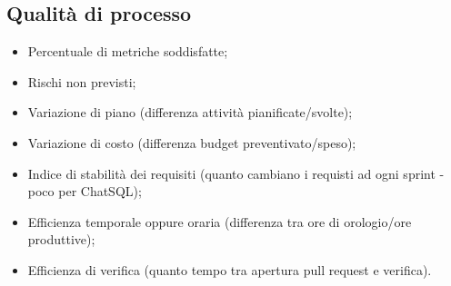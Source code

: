 \subsection{Qualità di processo}

\begin{itemize}
  \item Percentuale di metriche soddisfatte;
  \item Rischi non previsti;
  \item Variazione di piano (differenza attività pianificate/svolte);
  \item Variazione di costo (differenza budget preventivato/speso);
  \item Indice di stabilità dei requisiti (quanto cambiano i requisti ad ogni sprint - poco per ChatSQL);
  \item Efficienza temporale oppure oraria (differenza tra ore di orologio/ore produttive);
  \item Efficienza di verifica (quanto tempo tra apertura pull request e verifica).
\end{itemize}